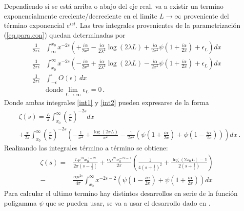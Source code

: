 Dependiendo si se está arriba o abajo del eje real, va a existir un termino exponencialmente creciente/decreciente en el limite $L \rightarrow \infty$  proveniente del término exponencial $e ^{i z t}$. Las tres integrales provenientes de la parametrización (\ref{eq.para.con}) quedan determinadas por 
\begin{align}
	\frac{ 1 }{2 \pi i}  
&	
	\int _{\infty} ^{x _0} 
	x ^{-2s}
	\left( +
	\frac{i \alpha}{2 x^2} - 
	\frac{i \alpha }{2 \lambda ^2} \log ( 2 \lambda L ) +
	\frac{i \alpha}{2 x ^2 } \psi \left( 1 + \frac{i \alpha}{2 x} \right) +
	\epsilon _L
	\right)
	d x
\label{int1}	
\\
	\frac{ 1 }{2 \pi i}  
&	
	\int _{x _0} ^{\infty} 
	x ^{-2s}
	\left( -
	\frac{i \alpha}{2 x^2} + 
	\frac{i \alpha }{2 \lambda ^2} \log ( 2 \lambda L ) -
	\frac{i \alpha}{2 x ^2 } \psi \left( 1 + \frac{i \alpha}{2 x} \right) +
	\epsilon _L
	\right)
	d x
\label{int2}	
\\
	\frac{ 1 }{2 \pi i}	
&
	\int _{- \epsilon} ^{\epsilon}
	O (\epsilon) \, dx
\\
&	
\nonumber
	\text{donde}
	\lim \limits _{L \rightarrow \infty} \epsilon _L = 0
\, .	
\end{align}
Donde ambas integrales \ref{int1} y \ref{int2} pueden expresarse de la forma
\begin{align}
&
	\zeta (s)=
	\frac{L }{\pi}
	\int _ {x_0} ^{\infty} \left( \frac{x}{\mu} \right) ^{-2s} dx
\\	 
& 
\nonumber
	+
	\frac{\alpha }{2 \pi } \int _{x_0} ^{\infty} 
	\left( \frac{x}{\mu} \right) ^{-2s}
	\left(-
	\frac{1}{ x ^2} +
	\frac{\log \left( 2 x L \right) }{x ^2}  -
	\frac{1}{ 2 x ^2 } 
	\left(
	\psi \left( 1 + \frac{i \alpha}{2  x} \right) + \psi \left( 1 - \frac{i \alpha}{2 x} \right) 
	\right)
	\right)
	d x
	\, .
\end{align}
Realizando las integrales término a término se obtiene:
\begin{align}
	\zeta (s)=
&
\nonumber
	\frac{L  \mu ^{2s} x _0 ^{1-2s} }{2 \pi \left( s- \frac{1}{2} \right)}  + 
	\frac{\alpha \mu ^{2s} x _{0} ^{-2s-1} }{2 \pi} 
	\left( 
	\frac{1}{4 \left(s+ \frac{1}{2} \right) ^2} +
	\frac{\log(2 x _0 L) -1 }{2 \left(s+\frac{1}{2} \right)} 
	\right) 
\\
-
&	
	\frac{\alpha \mu ^{2s} }{4 \pi}
	\int _{x_0} ^{\infty} 
	x ^{-2s-2}
	\left(
	\psi \left( 1 - \frac{i \alpha}{2 x} \right) +
	\psi \left( 1 + \frac{i \alpha}{2 x} \right)
	\right)
	dx
\end{align}
Para calcular el ultimo termino hay distintos desarrollos en serie de la función poligamma $\psi $ que se pueden usar, se va a usar el desarrollo dado en \cite{Abramowitz:1974:HMF:1098650}.

